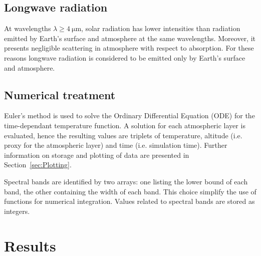 \documentclass[a4paper,10pt,final,twocolumn]{article}
\begin{document}

\subsection{Longwave radiation}
At wavelengths $\lambda \geq \qty{4}{\micro\metre}$, solar radiation has lower intensities than radiation emitted by Earth's surface and atmosphere at the same wavelengths. Moreover, it presents negligible scattering in atmosphere with respect to absorption. For these reasons longwave radiation is considered to be emitted only by Earth's surface and atmosphere.\cite[468]{ramanathan}


\subsection{Numerical treatment} %

Euler's method is used to solve the Ordinary Differential Equation (ODE) for the time-dependant temperature function.\cite[472]{ramanathan} A solution for each atmospheric layer is evaluated, hence the resulting values are triplets of temperature, altitude (i.e. proxy for the atmospheric layer) and time (i.e. simulation time). Further information on storage and plotting of data are presented in Section~\ref{sec:Plotting}.

Spectral bands are identified by two arrays: one listing the lower bound of each band, the other containing the width of each band. This choice simplify the use of functions for numerical integration. Values related to spectral bands are stored as integers.

\section{Results}
\end{document}
